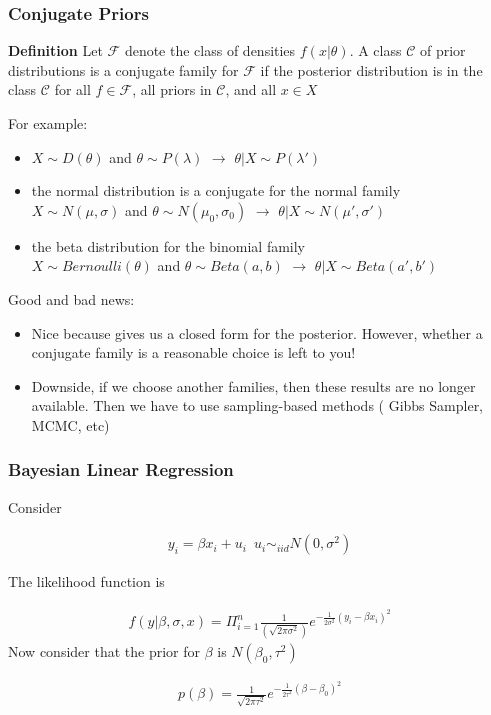 \documentclass[
  shownotes,
  xcolor={svgnames},
  hyperref={colorlinks,citecolor=DarkBlue,linkcolor=DarkRed,urlcolor=DarkBlue}
  , aspectratio=169]{beamer}
\begin{document}
\begin{frame}[fragile]
\frametitle{Conjugate Priors}

{\bf Definition}
Let $\mathcal{F}$ denote the class of densities $f(x|\theta)$. A class $\mathcal{C}$ of prior distributions is a conjugate family for $\mathcal{F}$ if the posterior distribution is in the class $\mathcal{C}$ for all $f\in\mathcal{F}$, all priors in $\mathcal{C}$, and all $x\in X$

\medskip

 

{\footnotesize For example:}

\begin{itemize}
  \footnotesize
  \item $X\sim D(\theta)$ and $\theta \sim P(\lambda)$ $\rightarrow$ $\theta|X \sim P(\lambda')$
  \item the normal distribution is a conjugate for the normal family \\
   $X\sim N(\mu,\sigma)$ and $\theta \sim N(\mu_0,\sigma_0)$ $\rightarrow$ $\theta|X \sim N(\mu',\sigma')$
  \item the beta distribution for the binomial family \\ 
  $X\sim Bernoulli(\theta)$ and $\theta \sim Beta(a,b)$ $\rightarrow$ $\theta|X \sim Beta(a',b')$
  
\end{itemize}

\medskip
\footnotesize
Good and bad news:
\begin{itemize}
\item Nice because gives us a closed form for the posterior. However, whether a conjugate family is a reasonable choice is left to you!
\item Downside, if we choose another families, then these results are no longer available. Then we have to use sampling-based methods ( Gibbs Sampler, MCMC, etc)
\end{itemize}


\end{frame}
\begin{frame}[fragile]
\frametitle{Bayesian Linear Regression}

Consider

\begin{align}
y_i= \beta x_i+u_i\,\,\,u_i \sim_{iid} N(0,\sigma^2)
\end{align}

The likelihood function is

\begin{align}
f(y|\beta,\sigma,x)=\Pi_{i=1}^n\frac{1}{(\sqrt{2\pi\sigma^2})}e^{-\frac{1}{2\sigma^2}(y_i-\beta x_i)^2}
\end{align}
Now consider that the prior for $\beta$ is $N(\beta_0,\tau^2)$

\begin{align}
p(\beta)=\frac{1}{\sqrt{2\pi\tau^2}}e^{-\frac{1}{2\tau^2}{(\beta-\beta_0)^2}}
\end{align}

\end{frame}
\end{document}
